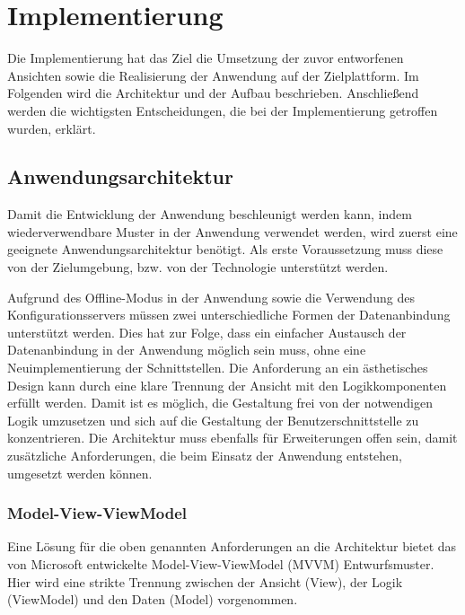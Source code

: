 \chapter{Implementierung}\label{chapter_5}
 Die Implementierung hat das Ziel die Umsetzung der zuvor entworfenen Ansichten sowie die Realisierung der Anwendung auf der Zielplattform. Im Folgenden wird die Architektur und der Aufbau beschrieben. Anschließend werden die wichtigsten Entscheidungen, die bei der Implementierung getroffen wurden, erklärt.

\section{Anwendungsarchitektur}
Damit die Entwicklung der Anwendung beschleunigt werden kann, indem wiederverwendbare Muster in der Anwendung verwendet werden, wird zuerst eine geeignete Anwendungsarchitektur benötigt. Als erste Voraussetzung muss diese von der Zielumgebung, bzw. von der Technologie unterstützt werden. \par 

Aufgrund des Offline-Modus in der Anwendung sowie die Verwendung des Konfigurationsservers müssen zwei unterschiedliche Formen der Datenanbindung unterstützt werden. Dies hat zur Folge, dass ein einfacher Austausch der Datenanbindung in der Anwendung möglich sein muss, ohne eine Neuimplementierung der Schnittstellen. Die Anforderung an ein ästhetisches Design kann durch eine klare Trennung der Ansicht mit den Logikkomponenten erfüllt werden. Damit ist es möglich, die Gestaltung frei von der notwendigen Logik umzusetzen und sich auf die Gestaltung der Benutzerschnittstelle zu konzentrieren. Die Architektur muss ebenfalls für Erweiterungen offen sein, damit zusätzliche Anforderungen, die beim Einsatz der Anwendung entstehen, umgesetzt werden können.

\subsection{Model-View-ViewModel}
Eine Lösung für die oben genannten Anforderungen an die Architektur bietet das von Microsoft entwickelte Model-View-ViewModel (MVVM) Entwurfsmuster. Hier wird eine strikte Trennung zwischen der Ansicht (View), der Logik (ViewModel) und den Daten (Model) vorgenommen.\par 

